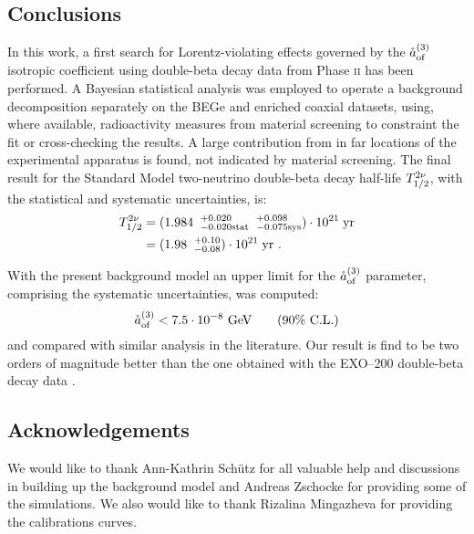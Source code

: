 \subsection*{Conclusions}
In this work, a first search for Lorentz-violating effects governed by the $\mathring{a}_\text{of}^{(3)}$ isotropic coefficient using double-beta decay data from {\gerda} Phase \textsc{ii} has been performed. A Bayesian statistical analysis was employed to operate a background decomposition separately on the BEGe and enriched coaxial datasets, using, where available, radioactivity measures from material screening to constraint the fit or cross-checking the results. A large contribution from  in far locations of the experimental apparatus is found, not indicated by material screening. The final result for the Standard Model two-neutrino double-beta decay half-life $T_{1/2}^{2\nu}$, with the statistical and systematic uncertainties, is:
\begin{equation}
	\begin{split}
		T_{1/2}^{2\nu} &=({1.984\;\;^{+0.020}_{-0.020\text{stat}}}\;\;{^{+0.098}_{-0.075\text{sys}}})\cdot10^{21}\;\text{yr}\\
				   &=(1.98\;\;^{+0.10}_{-0.08})\cdot10^{21}\;\text{yr}\ .\\
	\end{split}
\end{equation}

With the present background model an upper limit for the $\mathring{a}_\text{of}^{(3)}$ parameter, comprising the systematic uncertainties, was computed:
\begin{equation}\mathring{a}_\text{of}^{(3)}<7.5\cdot10^{-8}\ \text{GeV}\qquad(\text{90\% C.L.})\end{equation}
and compared with similar analysis in the literature. Our result is find to be two orders of magnitude better than the one obtained with the EXO--200 double-beta decay data \cite{exo200}.
\vspace*{3cm}
\subsection*{Acknowledgements}
We would like to thank Ann-Kathrin Schütz for all valuable help and discussions in building up the background model and Andreas Zschocke for providing some of the simulations. We also would like to thank Rizalina Mingazheva for providing the calibrations curves.

